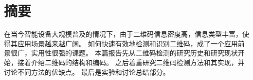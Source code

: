 \section{摘要}
在当今智能设备大规模普及的情况下，由于二维码信息密度高，信息类型丰富，使得其应用场景越来越广阔。
如何快速有效地检测和识别二维码，成了一个应用前景很广，实用性很强的课题。
本篇报告先从二维码检测的研究历史和研究现状开始，接着介绍二维码的结构和编码。
之后着重研究二维码检测方法和其实现，并讨论不同方法的优缺点。
最后是实验和讨论总结部分。
